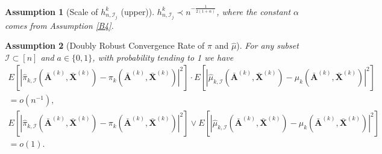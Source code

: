 \documentclass[11pt]{article}
\theoremstyle{referenceplain}
\newtheorem{assumption}{Assumption}
\theoremstyle{referencedefinition}
\theoremstyle{referenceremark}
\begin{document}
\begin{assumption}[Scale of $h_{n,\mathcal{I}_j}^{k}$ (upper)]\label{B6}
    $h_{n,\mathcal{I}_j}^{k}\prec n^{-\frac{1}{2(1+\alpha)}}$, where the constant $\alpha$ comes from Assumption \ref{B4}.
\end{assumption}
\begin{assumption}[Doubly Robust Convergence Rate of $\widehat{\pi}$ and $\widehat{\mu}$]\label{B7}
    For any subset $\mathcal{I}\subset[n]$ and $a\in\{0,1\}$, with probability tending to 1 we have 
\begin{align*}
E\left[\left|\widehat{\pi}_{k,\mathcal{I}}\left(\bar{\mathbf{A}}^{(k)}, \bar{\mathbf{X}}^{(k)}\right)-\pi_k\left(\bar{\mathbf{A}}^{(k)}, \bar{\mathbf{X}}^{(k)}\right)\right|^2\right]\cdot E\left[\left|\widehat{\mu}_{k,\mathcal{I}}\left(\bar{\mathbf{A}}^{(k)}, \bar{\mathbf{X}}^{(k)}\right)-\mu_k\left(\bar{\mathbf{A}}^{(k)}, \bar{\mathbf{X}}^{(k)}\right)\right|^2\right]\\=o(n^{-1}),\\
E\left[\left|\widehat{\pi}_{k,\mathcal{I}}\left(\bar{\mathbf{A}}^{(k)}, \bar{\mathbf{X}}^{(k)}\right)-\pi_k\left(\bar{\mathbf{A}}^{(k)}, \bar{\mathbf{X}}^{(k)}\right)\right|^2\right]\lor E\left[\left|\widehat{\mu}_{k,\mathcal{I}}\left(\bar{\mathbf{A}}^{(k)}, \bar{\mathbf{X}}^{(k)}\right)-\mu_k\left(\bar{\mathbf{A}}^{(k)}, \bar{\mathbf{X}}^{(k)}\right)\right|^2\right]\\=o(1).
\end{align*}
\end{assumption}
\end{document}
